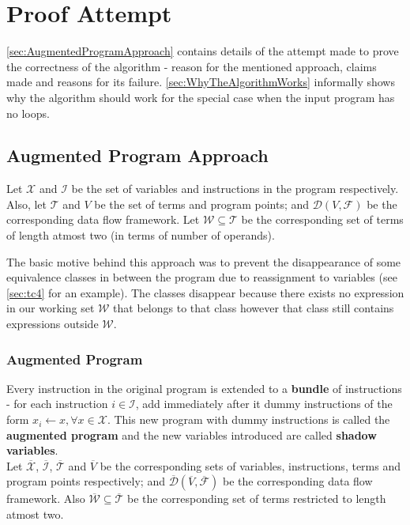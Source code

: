\chapter{Proof Attempt}
\label{chap:chapter9}

\autoref{sec:AugmentedProgramApproach} contains details of the attempt made to prove the correctness of the algorithm - reason for the mentioned approach, claims made and reasons for its failure. \autoref{sec:WhyTheAlgorithmWorks} informally shows why the algorithm should work for the special case when the input program has no loops.

\section{Augmented Program Approach}
\label{sec:AugmentedProgramApproach}
Let $\mathcal{X}$ and $\mathcal{I}$ be the set of variables and instructions in the program respectively. Also, let $\mathcal{T}$ and $V$ be the set of terms and program points; and $\mathcal{D}(V, \mathcal{F})$ be the corresponding data flow framework. Let $\mathcal{W} \subseteq \mathcal{T}$ be the corresponding set of terms of length atmost two (in terms of number of operands).

The basic motive behind this approach was to prevent the disappearance of some equivalence classes in between the program due to reassignment to variables (see \autoref{sec:tc4} for an example). The classes disappear because there exists no expression in our working set $\mathcal{W}$ that belongs to that class however that class still contains expressions outside $\mathcal{W}$.

\subsection{Augmented Program}
\label{subsec:AugmentedProgram}

Every instruction in the original program is extended to a \textbf{bundle} of instructions - for each instruction $i \in \mathcal{I}$, add immediately after it dummy instructions of the form $x_i \gets x, \forall x \in \mathcal{X}$. This new program with dummy instructions is called the \textbf{augmented program} and the new variables introduced are called \textbf{shadow variables}.
\\
Let $\overline{\mathcal{X}}$, $\overline{\mathcal{I}}$, $\overline{\mathcal{T}}$ and $\overline{V}$ be the corresponding sets of variables, instructions, terms and program points respectively; and $\overline{\mathcal{D}}(\overline{V}, \overline{\mathcal{F}})$ be the corresponding data flow framework. Also $\overline{\mathcal{W}} \subseteq \overline{\mathcal{T}}$ be the corresponding set of terms restricted to length atmost two.

